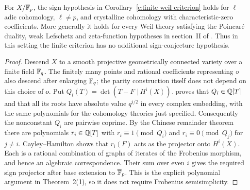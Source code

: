 \begin{corollary}
\label{c:finite-field-sign}
For $X/\overline{\mathbb F}_p$, the sign hypothesis in
Corollary~\ref{c:finite-weil-criterion} holds for $\ell$-adic
cohomology, $\ell\ne p$, and crystalline cohomology with
characteristic-zero coefficients.  More generally it holds for
every Weil theory satisfying the Poincar\'e duality, weak
Lefschetz and zeta-function hypotheses in section~II of
\citet{c_katzmessing1974}.  Thus in this setting the finite
criterion has no additional sign-conjecture hypothesis.
\end{corollary}

\begin{proof}
Descend $X$ to a smooth projective geometrically connected variety
over a finite field $\mathbb F_q$.  The finitely many points and rational
coefficients representing $o$ also descend after enlarging
$\mathbb F_q$; the parity construction itself does not depend on this
choice of $o$.  Put
$Q_i(T)=\det(T-F\mid H^i(X))$.
\citet[Theorem~1, pp.~74--75; Theorem~2(1), pp.~76--77]{c_katzmessing1974}
proves that $Q_i\in\mathbb Q[T]$ and that all its roots have absolute
value $q^{i/2}$ in every complex embedding, with the same
polynomials for the cohomology theories just specified.
Consequently the nonconstant $Q_i$ are pairwise coprime.
By the Chinese remainder theorem there are polynomials
$r_i\in\mathbb Q[T]$ with $r_i\equiv1\pmod{Q_i}$ and
$r_i\equiv0\pmod{Q_j}$ for $j\ne i$.
Cayley--Hamilton shows that $r_i(F)$ acts as the projector onto
$H^i(X)$.  Each is a rational combination of graphs of iterates
of the Frobenius morphism, and hence an algebraic correspondence.
Their sum over even $i$ gives the required sign projector after
base extension to $\overline{\mathbb F}_p$.  This is the explicit
polynomial argument in Theorem~2(1), so it does not require
Frobenius semisimplicity.
\end{proof}


